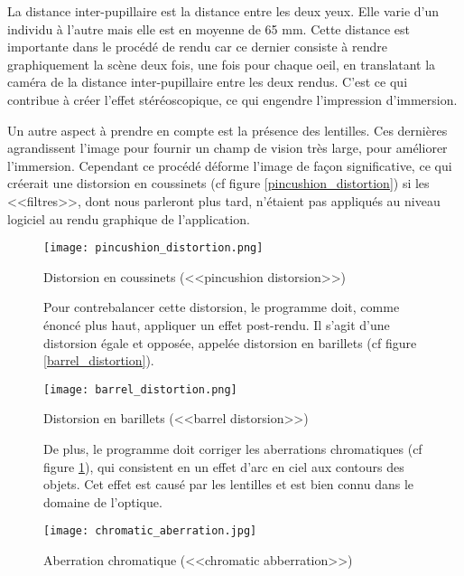 \documentclass[a4paper,french,12pt]{article}
\begin{document}
			    La distance inter-pupillaire est la distance entre les deux yeux. Elle varie d'un individu
			    à l'autre mais elle est en moyenne de 65 mm. Cette distance est importante dans le procédé
			    de rendu car ce dernier consiste à rendre graphiquement la scène deux fois, une fois pour
			    chaque oeil, en translatant la caméra de la distance inter-pupillaire entre les deux rendus.
			    C'est ce qui contribue à créer l'effet stéréoscopique, ce qui engendre l'impression d'immersion.

			    Un autre aspect à prendre en compte est la présence des lentilles. Ces dernières agrandissent
			    l'image pour fournir un champ de vision très large, pour améliorer l'immersion.
			    Cependant ce procédé déforme l'image de façon significative, ce qui créerait une distorsion
			    en coussinets (cf figure \ref{pincushion_distortion}) si les <<filtres>>, dont nous parleront plus tard,
			    n'étaient pas appliqués au niveau logiciel au rendu graphique de l'application.\\
			    \FloatBarrier
			    \begin{figure}[h!]
			      \centering
				\texttt{[image: pincushion\_distortion.png]}
			      \caption{Distorsion en coussinets (<<pincushion distorsion>>)}\par\medskip
			      \label{pincushion_distortion}

			    \FloatBarrier
			    Pour contrebalancer cette distorsion, le programme doit, comme énoncé plus haut, appliquer
			    un effet post-rendu. Il s'agit d'une distorsion égale et opposée, appelée distorsion en
			    barillets (cf figure \ref{barrel_distortion}).\par\bigskip

			    {
			      \centering
				\texttt{[image: barrel\_distortion.png]}
			      \caption{Distorsion en barillets (<<barrel distorsion>>)}
			      \label{barrel_distortion}
			    }\par\medskip
			    \FloatBarrier
			    De plus, le programme doit corriger les aberrations chromatiques (cf figure \ref{chromatic_aberration}), qui consistent en un effet
			    d'arc en ciel aux contours des objets. Cet effet est causé par les lentilles et est
			    bien connu dans le domaine de l'optique.\par\bigskip
			    \FloatBarrier
			  {
			      \centering
				\texttt{[image: chromatic\_aberration.jpg]}
			      \caption{Aberration chromatique (<<chromatic abberration>>)}
			      \label{chromatic_aberration}
			  }
			    \end{figure}  ~ \\
\end{document}
